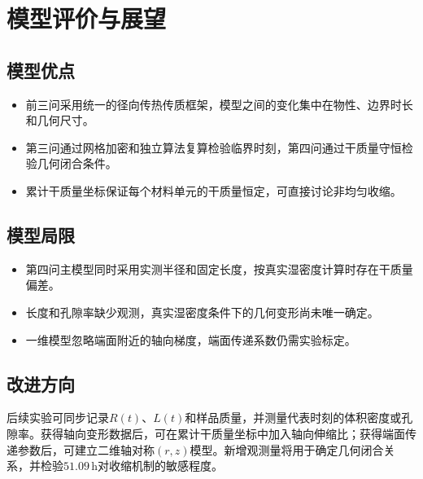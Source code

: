 
\section{模型评价与展望}

\subsection{模型优点}
\begin{itemize}[leftmargin=2em,itemsep=1pt,topsep=2pt]
  \item 前三问采用统一的径向传热传质框架，模型之间的变化集中在物性、边界时长和几何尺寸。
  \item 第三问通过网格加密和独立算法复算检验临界时刻，第四问通过干质量守恒检验几何闭合条件。
  \item 累计干质量坐标保证每个材料单元的干质量恒定，可直接讨论非均匀收缩。
\end{itemize}

\subsection{模型局限}
\begin{itemize}[leftmargin=2em,itemsep=1pt,topsep=2pt]
  \item 第四问主模型同时采用实测半径和固定长度，按真实湿密度计算时存在干质量偏差。
  \item 长度和孔隙率缺少观测，真实湿密度条件下的几何变形尚未唯一确定。
  \item 一维模型忽略端面附近的轴向梯度，端面传递系数仍需实验标定。
\end{itemize}

\subsection{改进方向}
后续实验可同步记录$R(t)$、$L(t)$和样品质量，并测量代表时刻的体积密度或孔隙率。获得轴向变形数据后，可在累计干质量坐标中加入轴向伸缩比；获得端面传递参数后，可建立二维轴对称$(r,z)$模型。新增观测量将用于确定几何闭合关系，并检验$51.09\,\mathrm h$对收缩机制的敏感程度。
